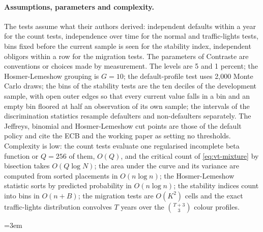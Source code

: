 \paragraph{Assumptions, parameters and complexity.} The tests assume what their authors derived: independent defaults within a year for the count tests, independence over time for the normal and
traffic-lights tests, bins fixed before the current sample is seen for the stability index, independent obligors within a row for the migration tests. The parameters of Contraste are conventions or choices made by
measurement. The levels are 5 and 1 percent; the Hosmer-Lemeshow grouping is $G=10$; the default-profile test uses 2,000 Monte Carlo draws; the bins of the stability tests are the ten deciles of the development
sample, with open outer edges so that every current value falls in a bin and an empty bin floored at half an observation of its own sample; the intervals of the discrimination statistics resample defaulters and
non-defaulters separately. The Jeffreys, binomial and Hosmer-Lemeshow cut points are those of the default policy and cite the ECB and the working paper as setting no thresholds. Complexity is low: the count tests
evaluate one regularised incomplete beta function or $Q=256$ of them, $O(Q)$, and the critical count of \cref{eq:vt-mixture} by bisection takes $O(Q\log N)$; the area under the curve and its variance are computed from
sorted placements in $O(n\log n)$; the Hosmer-Lemeshow statistic sorts by predicted probability in $O(n\log n)$; the stability indices count into bins in $O(n+B)$; the migration tests are $O(K^2)$ cells and the exact
traffic-lights distribution convolves $T$ years over the $\binom{T+3}{3}$ colour profiles.

\begingroup\emergencystretch=3em
